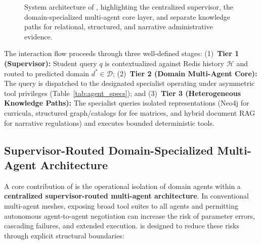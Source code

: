 \begin{figure}[!htbp]
\caption{System architecture of \system{}, highlighting the centralized supervisor, the domain-specialized multi-agent core layer, and separate knowledge paths for relational, structured, and narrative administrative evidence.}
\label{fig:architecture}
\end{figure}

The interaction flow proceeds through three well-defined stages: (1)~\textbf{Tier 1 (Supervisor):} Student query $q$ is contextualized against Redis history $\mathcal{H}$ and routed to predicted domain $d^* \in \mathcal{D}$; (2)~\textbf{Tier 2 (Domain Multi-Agent Core):} The query is dispatched to the designated specialist operating under asymmetric tool privileges (Table~\ref{tab:agent_specs}); and (3)~\textbf{Tier 3 (Heterogeneous Knowledge Paths):} The specialist queries isolated representations (Neo4j for curricula, structured graph/catalogs for fee matrices, and hybrid document RAG for narrative regulations) and executes bounded deterministic tools.

\subsection{Supervisor-Routed Domain-Specialized Multi-Agent Architecture}
\label{sec:agents}

A core contribution of \system{} is the operational isolation of domain agents within a \textbf{centralized supervisor-routed multi-agent architecture}. In conventional multi-agent meshes, exposing broad tool suites to all agents and permitting autonomous agent-to-agent negotiation can increase the risk of parameter errors, cascading failures, and extended execution. \system{} is designed to reduce these risks through explicit structural boundaries:

